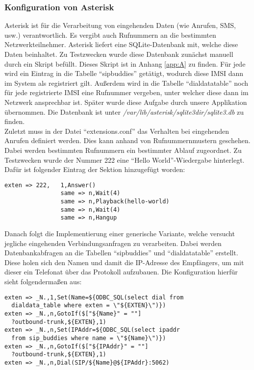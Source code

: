 \subsubsection{Konfiguration von Asterisk}
Asterisk ist für die Verarbeitung von eingehenden Daten (wie Anrufen, SMS, usw.) verantwortlich. Es vergibt auch Rufnummern an die bestimmten Netzwerkteilnehmer. Asterisk liefert eine SQLite-Datenbank mit, welche diese Daten beinhaltet. Zu Testzwecken wurde diese Datenbank zunächst manuell durch ein Skript befüllt. Dieses Skript ist in Anhang \ref{app:A} zu finden. Für jede \IMSI wird ein Eintrag in die Tabelle ``sip\textunderscore buddies'' getätigt, wodurch diese IMSI dann im System als registriert gilt. Außerdem wird in die Tabelle ``dialdata\textunderscore table'' noch für jede registrierte IMSI eine Rufnummer vergeben, unter welcher diese dann im Netzwerk ansprechbar ist. Später wurde diese Aufgabe durch unsere Applikation übernommen. Die Datenbank ist unter \textit{/var/lib/asterisk/sqlite3dir/sqlite3.db} zu finden. \\
Zuletzt muss in der Datei ``extensions.conf'' das Verhalten bei eingehenden Anrufen definiert werden. Dies kann anhand von Rufnummernmustern geschehen. Dabei werden bestimmten Rufnummern ein bestimmter Ablauf zugeordnet. Zu Testzwecken wurde der Nummer 222 eine ``Hello World''-Wiedergabe hinterlegt. Dafür ist folgender Eintrag der \inlinecode{[phones]} Sektion hinzugefügt worden:
\begin{lstlisting}
exten => 222,   1,Answer()
                same => n,Wait(4)
                same => n,Playback(hello-world)
                same => n,Wait(4)
                same => n,Hangup
\end{lstlisting}

Danach folgt die Implementierung einer generische Variante, welche versucht jegliche eingehenden Verbindungsanfragen zu verarbeiten. Dabei werden Datenbankabfragen an die Tabellen ``sip\textunderscore buddies'' und ``dialdata\textunderscore table'' erstellt. Diese holen sich den Namen und damit die IP-Adresse des Empfängers, um mit dieser ein Telefonat über das 
Protokoll \SIP aufzubauen. Die Konfiguration hierfür sieht folgendermaßen aus:
\begin{lstlisting}
exten => _N.,1,Set(Name=${ODBC_SQL(select dial from 
  dialdata_table where exten = \"${EXTEN}\")})
exten => _N.,n,GotoIf($["${Name}" = ""] 
  ?outbound-trunk,${EXTEN},1)
exten => _N.,n,Set(IPAddr=${ODBC_SQL(select ipaddr 
  from sip_buddies where name = \"${Name}\")})
exten => _N.,n,GotoIf($["${IPAddr}" = ""] 
  ?outbound-trunk,${EXTEN},1)
exten => _N.,n,Dial(SIP/${Name}@${IPAddr}:5062)
\end{lstlisting}

